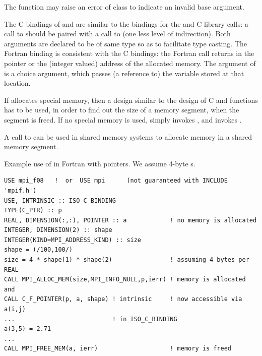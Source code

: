 The function  may raise an error of class
 to indicate an invalid base argument.

\begin{rationale}
The C bindings of  and
 are similar to the bindings for the
 and  C library calls:
a call to
 should be paired with a call to
 (one less 
level of indirection). Both arguments are declared to
be of same type  so as to facilitate type casting.
The Fortran binding is consistent with the C bindings:
the Fortran  call returns in 
 the  pointer or
the (integer valued) address 
of the allocated memory.
The  argument of  is a choice
argument, which passes (a reference to) the variable stored at that location.
\end{rationale}

\begin{implementors}
If  allocates special memory, then
a design similar to the design of C  and 
functions has to
be used, in order to find out the size of a memory segment, when the segment is freed.
If no special memory is used,
 simply invokes , and  invokes .

A call to  can be used in shared memory
systems to allocate  memory in a shared memory segment.
\end{implementors}

\begin{example}
\label{ex:1side-fmalloc-ptr}
%
Example use of  in Fortran with
 pointers. We assume 4-byte s.
\begin{lstlisting}[language={[MPI08]Fortran},basicstyle=\lstsmall]
USE mpi_f08   !  or  USE mpi      (not guaranteed with INCLUDE 'mpif.h')
USE, INTRINSIC :: ISO_C_BINDING
TYPE(C_PTR) :: p
REAL, DIMENSION(:,:), POINTER :: a            ! no memory is allocated
INTEGER, DIMENSION(2) :: shape
INTEGER(KIND=MPI_ADDRESS_KIND) :: size
shape = (/100,100/)
size = 4 * shape(1) * shape(2)                ! assuming 4 bytes per REAL
CALL MPI_ALLOC_MEM(size,MPI_INFO_NULL,p,ierr) ! memory is allocated and
CALL C_F_POINTER(p, a, shape) ! intrinsic     ! now accessible via a(i,j)
...                           ! in ISO_C_BINDING
a(3,5) = 2.71
...
CALL MPI_FREE_MEM(a, ierr)                    ! memory is freed
\end{lstlisting}
\end{example}

